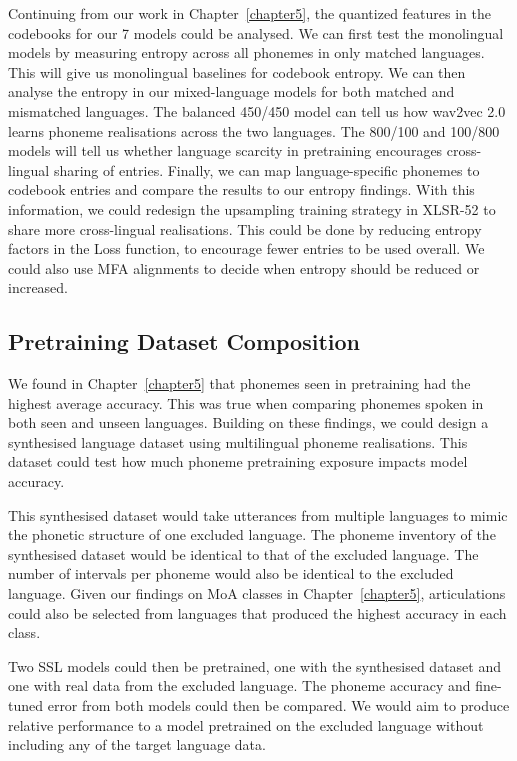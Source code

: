Continuing from our work in Chapter~\ref{chapter5}, the quantized features in the codebooks for our 7 models could be analysed. We can first test the monolingual models by measuring entropy across all phonemes in only matched languages. This will give us monolingual baselines for codebook entropy. We can then analyse the entropy in our mixed-language models for both matched and mismatched languages. The balanced 450/450 model can tell us how wav2vec 2.0 learns phoneme realisations across the two languages. The 800/100 and 100/800 models will tell us whether language scarcity in pretraining encourages cross-lingual sharing of entries. Finally, we can map language-specific phonemes to codebook entries and compare the results to our entropy findings. With this information, we could redesign the upsampling training strategy in XLSR-52 \cite{XLSR-53} to share more cross-lingual realisations. This could be done by reducing entropy factors in the Loss function, to encourage fewer entries to be used overall. We could also use MFA alignments to decide when entropy should be reduced or increased. 

\subsection{Pretraining Dataset Composition}

We found in Chapter~\ref{chapter5} that phonemes seen in pretraining had the highest average accuracy. This was true when comparing phonemes spoken in both seen and unseen languages. Building on these findings, we could design a synthesised language dataset using multilingual phoneme realisations. This dataset could test how much phoneme pretraining exposure impacts model accuracy.

This synthesised dataset would take utterances from multiple languages to mimic the phonetic structure of one excluded language. The phoneme inventory of the synthesised dataset would be identical to that of the excluded language. The number of intervals per phoneme would also be identical to the excluded language. Given our findings on MoA classes in Chapter~\ref{chapter5}, articulations could also be selected from languages that produced the highest accuracy in each class.

Two SSL models could then be pretrained, one with the synthesised dataset and one with real data from the excluded language. The phoneme accuracy and fine-tuned error from both models could then be compared. We would aim to produce relative performance to a model pretrained on the excluded language without including any of the target language data. 

